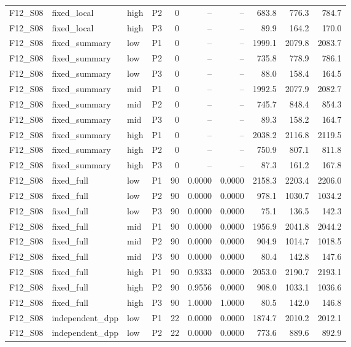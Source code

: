 \begin{longtable}{llllrrrrrr}
F12\_S08 & fixed\_local & high & P2 & 0 & -- & -- & 683.8 & 776.3 & 784.7 \\
F12\_S08 & fixed\_local & high & P3 & 0 & -- & -- & 89.9 & 164.2 & 170.0 \\
F12\_S08 & fixed\_summary & low & P1 & 0 & -- & -- & 1999.1 & 2079.8 & 2083.7 \\
F12\_S08 & fixed\_summary & low & P2 & 0 & -- & -- & 735.8 & 778.9 & 786.1 \\
F12\_S08 & fixed\_summary & low & P3 & 0 & -- & -- & 88.0 & 158.4 & 164.5 \\
F12\_S08 & fixed\_summary & mid & P1 & 0 & -- & -- & 1992.5 & 2077.9 & 2082.7 \\
F12\_S08 & fixed\_summary & mid & P2 & 0 & -- & -- & 745.7 & 848.4 & 854.3 \\
F12\_S08 & fixed\_summary & mid & P3 & 0 & -- & -- & 89.3 & 158.2 & 164.7 \\
F12\_S08 & fixed\_summary & high & P1 & 0 & -- & -- & 2038.2 & 2116.8 & 2119.5 \\
F12\_S08 & fixed\_summary & high & P2 & 0 & -- & -- & 750.9 & 807.1 & 811.8 \\
F12\_S08 & fixed\_summary & high & P3 & 0 & -- & -- & 87.3 & 161.2 & 167.8 \\
F12\_S08 & fixed\_full & low & P1 & 90 & 0.0000 & 0.0000 & 2158.3 & 2203.4 & 2206.0 \\
F12\_S08 & fixed\_full & low & P2 & 90 & 0.0000 & 0.0000 & 978.1 & 1030.7 & 1034.2 \\
F12\_S08 & fixed\_full & low & P3 & 90 & 0.0000 & 0.0000 & 75.1 & 136.5 & 142.3 \\
F12\_S08 & fixed\_full & mid & P1 & 90 & 0.0000 & 0.0000 & 1956.9 & 2041.8 & 2044.2 \\
F12\_S08 & fixed\_full & mid & P2 & 90 & 0.0000 & 0.0000 & 904.9 & 1014.7 & 1018.5 \\
F12\_S08 & fixed\_full & mid & P3 & 90 & 0.0000 & 0.0000 & 80.4 & 142.8 & 147.6 \\
F12\_S08 & fixed\_full & high & P1 & 90 & 0.9333 & 0.0000 & 2053.0 & 2190.7 & 2193.1 \\
F12\_S08 & fixed\_full & high & P2 & 90 & 0.9556 & 0.0000 & 908.0 & 1033.1 & 1036.6 \\
F12\_S08 & fixed\_full & high & P3 & 90 & 1.0000 & 1.0000 & 80.5 & 142.0 & 146.8 \\
F12\_S08 & independent\_dpp & low & P1 & 22 & 0.0000 & 0.0000 & 1874.7 & 2010.2 & 2012.1 \\
F12\_S08 & independent\_dpp & low & P2 & 22 & 0.0000 & 0.0000 & 773.6 & 889.6 & 892.9 \\

\end{longtable}
